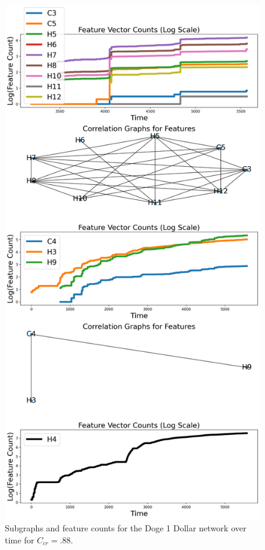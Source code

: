 \documentclass[a4paper,11pt]{article}
\begin{document}
\begin{figure}[h!]
    \includegraphics[width=.85\linewidth]{Images/Doge1Dollar/connected_components.png}
    \centering
    \caption{Subgraphs and feature counts for the Doge 1 Dollar network over time for $C_{cr}=.88$.}
\end{figure}



\end{document}
